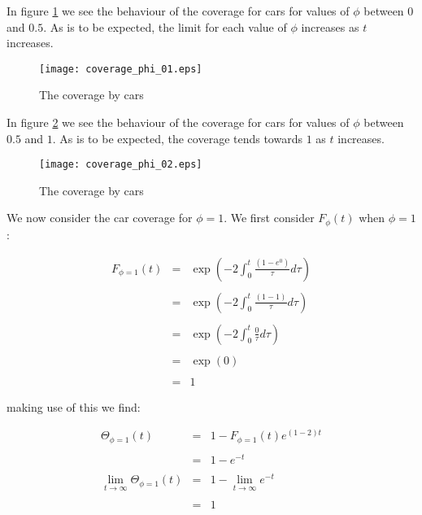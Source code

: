 \newpage

In figure \ref{fig:cp1} we see the behaviour of the coverage for cars for 
values of $\phi$ between $0$ and $0.5$. As is to be expected, the limit 
for each value of $\phi$ increases as $t$ increases. \bigskip

\begin{figure}[h!]
	\centering
	\texttt{[image: coverage\_phi\_01.eps]}
	\caption{The coverage by cars}
	\label{fig:cp1}
\end{figure}\medskip

\newpage

In figure \ref{fig:cp2} we see the behaviour of the coverage for cars for 
values of $\phi$ between $0.5$ and $1$. As is to be expected, the coverage 
tends towards $1$ as $t$ increases. \bigskip

\begin{figure}[h!]
	\centering
	\texttt{[image: coverage\_phi\_02.eps]}
	\caption{The coverage by cars}
	\label{fig:cp2}
\end{figure}\medskip

\newpage

We now consider the car coverage for $\phi = 1$. We first consider 
$F_{\phi}(t)$ when $\phi = 1$: \bigskip

\begin{eqnarray*}
	F_{\phi = 1}(t) & = & \exp \left( -2 \int_{0}^{t} \frac{(1 - e^{0})}{\tau} d\tau \right) \\\\
					& = & \exp \left( -2 \int_{0}^{t} \frac{(1 - 1)}{\tau} d\tau \right) \\\\
					& = & \exp \left( -2 \int_{0}^{t} \frac{0}{\tau} d\tau \right) \\\\
					& = & \exp \left( 0 \right) \\\\
					& = & 1
\end{eqnarray*}\medskip

making use of this we find: \bigskip

\begin{eqnarray*}
						\Theta_{\phi = 1}(t) & = & 1 - F_{\phi = 1}(t) e^{(1 - 2)t} \\\\
											 & = & 1 - e^{-t} \\\\
	\lim_{t \to \infty} \Theta_{\phi = 1}(t) & = & 1 - \lim_{t \to \infty} e^{-t} \\\\
											 & = & 1
\end{eqnarray*}\medskip

